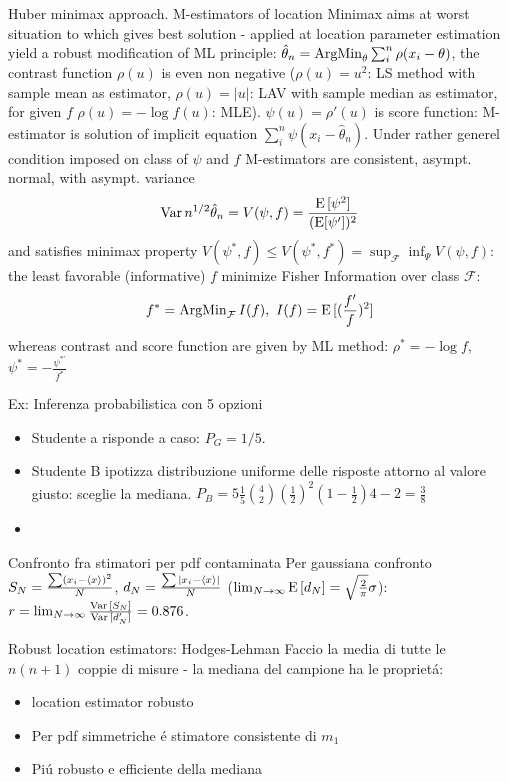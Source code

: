 \documentclass[asd-beamer.tex]{subfiles}%
\begin{document}
\begin{frame}{Huber minimax approach. M-estimators of location}
	Minimax aims at worst situation to which gives best solution - applied at location parameter estimation yield a robust modification of ML principle: $\hat{\theta}_n=\operatorname{ArgMin}_{\theta}\sum_i^n\rho(x_i-\theta)$, the contrast function $\rho(u)$ is even non negative ($\rho(u)=u^2$: LS method with sample mean as estimator, $\rho(u)=|u|$: LAV with sample median as estimator, for given $f$ $\rho(u)=-\log{f(u)}$: MLE). $\psi(u)=\rho'(u)$ is score function: M-estimator is solution of implicit equation $\sum_i^n\psi(x_i-\hat{\theta}_n)$.
	Under rather generel condition imposed on class of $\psi$ and $f$ M-estimators are consistent, asympt. normal, with asympt. variance
	\[\operatorname{Var}{n^{1/2}\hat{\theta}_n}=V(\psi,f)=\frac{\operatorname{E}{[\psi^2]}}{(\operatorname{E}[\psi'])^2}\]
	and satisfies minimax property $V(\psi^*,f)\leq V(\psi^*,f^*)=\sup_{\mathcal{F}}\inf_{\Psi}V(\psi,f)$: the least favorable (informative) $f$ minimize Fisher Information over class $\mathcal{F}$:
	\[f^*=\argmin_{\mathcal{F}}I(f),\ I(f)=\E{[(\frac{f'}{f})^2]}\]
	whereas contrast and score function are given by ML method: $\rho^*=-\log{f}$, $\psi^*=-\frac{\psi^{*'}}{f^*}$
\end{frame}

\begin{wordonframe}{Ex: Inferenza probabilistica}
 con  5 opzioni
\begin{itemize}
\item Studente a risponde a caso: $P_G=1/5$.
\item Studente B ipotizza distribuzione uniforme delle risposte attorno al valore giusto: sceglie la mediana. $P_B=5\frac{1}{5}\binom{4}{2}(\frac{1}{2})^2(1-\frac{1}{2}){4-2}=\frac{3}{8}$
\item {}
\end{itemize}

\end{wordonframe}

\begin{wordonframe}{Confronto fra stimatori per pdf contaminata}
Per gaussiana confronto $S_N=\frac{\sum(x_i-\langle x \rangle)^2}{N}$, $d_N=\frac{\sum|x_i-\langle x \rangle|}{N}$ ($\lim_{N\to\infty}\operatorname{E}{[d_N]}=\sqrt{\frac{2}{\pi}}\sigma$): $r=\lim_{N\to\infty}\frac{\operatorname{Var}{[S_N]}}{\operatorname{Var}{[d_N']}}=0.876$.
\end{wordonframe}

\begin{frame}{Robust location estimators: Hodges-Lehman}
Faccio la media di tutte le $n(n+1)$ coppie di misure - la mediana del campione ha le propriet\'a:
\begin{itemize}
\item location estimator robusto
\item Per pdf simmetriche \'e stimatore consistente di $m_1$
\item Pi\'u robusto e efficiente della mediana	
\end{itemize}
\end{frame}
\end{document}
